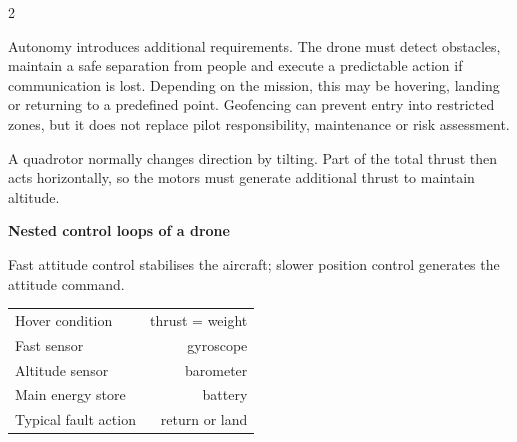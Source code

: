 \begin{multicols}{2}
\begin{ecarticle}
Autonomy introduces additional requirements. The drone must detect obstacles, maintain a safe
separation from people and execute a predictable action if communication is lost. Depending on the
mission, this may be hovering, landing or returning to a predefined point. Geofencing can prevent
entry into restricted zones, but it does not replace pilot responsibility, maintenance or risk
assessment.
\end{ecarticle}

\begin{tcolorbox}[title=\sffamily\bfseries Did You Know?,colback=yellow!10,colframe=ECOrange]
A quadrotor normally changes direction by tilting. Part of the total thrust then acts horizontally,
so the motors must generate additional thrust to maintain altitude.
\end{tcolorbox}

\begin{engineeringfocus}
\textbf{Nested control loops of a drone}
\begin{center}
\end{center}
Fast attitude control stabilises the aircraft; slower position control generates the attitude command.
\end{engineeringfocus}

\begin{keyfigures}
\begin{tabularx}{\linewidth}{@{}Xr@{}}
Hover condition & thrust = weight\\
Fast sensor & gyroscope\\
Altitude sensor & barometer\\
Main energy store & battery\\
Typical fault action & return or land
\end{tabularx}
\end{keyfigures}


\end{multicols}
